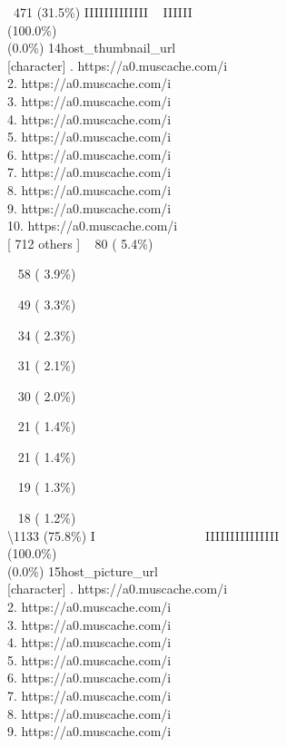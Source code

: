 \documentclass[
  journal,
]{IEEEtran}%
\begin{document}
\strut ~471 (31.5\%) \textbar{} \textbar IIIIIIIIIIIII ~ IIIIII
\\
(100.0\%) \\
(0.0\%) \textbar{} \textbar{} 14\textbar host\_thumbnail\_url\\
{[}character{]} . https://a0.muscache.com/i\\
2. https://a0.muscache.com/i\\
3. https://a0.muscache.com/i\\
4. https://a0.muscache.com/i\\
5. https://a0.muscache.com/i\\
6. https://a0.muscache.com/i\\
7. https://a0.muscache.com/i\\
8. https://a0.muscache.com/i\\
9. https://a0.muscache.com/i\\
10. https://a0.muscache.com/i\\
{[} 712 others {]} \textbar~ 80 ( 5.4\%)\\
\strut ~ 58 ( 3.9\%)\\
\strut ~ 49 ( 3.3\%)\\
\strut ~ 34 ( 2.3\%)\\
\strut ~ 31 ( 2.1\%)\\
\strut ~ 30 ( 2.0\%)\\
\strut ~ 21 ( 1.4\%)\\
\strut ~ 21 ( 1.4\%)\\
\strut ~ 19 ( 1.3\%)\\
\strut ~ 18 ( 1.2\%)\\
\textbackslash1133 (75.8\%) \textbar{} \textbar I ~ ~ ~ ~ ~ ~ ~ ~ ~ ~
IIIIIIIIIIIIIII \\
(100.0\%) \\
(0.0\%) \textbar{} \textbar{} 15\textbar host\_picture\_url\\
{[}character{]} . https://a0.muscache.com/i\\
2. https://a0.muscache.com/i\\
3. https://a0.muscache.com/i\\
4. https://a0.muscache.com/i\\
5. https://a0.muscache.com/i\\
6. https://a0.muscache.com/i\\
7. https://a0.muscache.com/i\\
8. https://a0.muscache.com/i\\
9. https://a0.muscache.com/i\\
\end{document}
